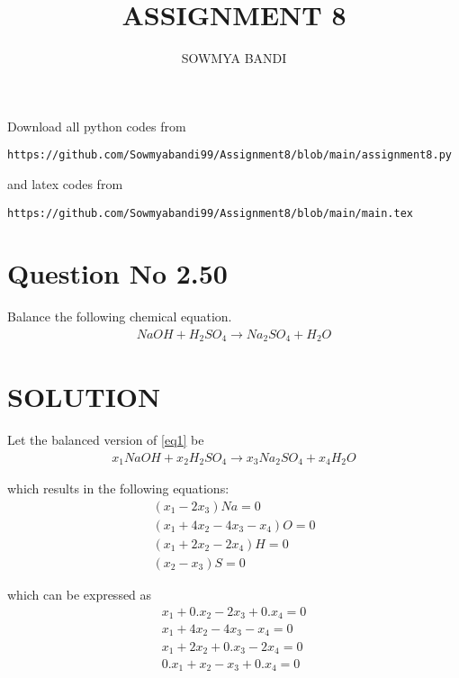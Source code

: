 \documentclass[journal,12pt,twocolumn]{IEEEtran}
\begin{document}
     \def\rightbox#1{\makebox[0in][r]{#1}}
     \def\centbox#1{\makebox[0in]{#1}}
     \def\topbox#1{\raisebox{-\baselineskip}[0in][0in]{#1}}
     \def\midbox#1{\raisebox{-0.5\baselineskip}[0in][0in]{#1}}
\vspace{3cm}
\title{ASSIGNMENT 8}
\author{SOWMYA BANDI}
\maketitle
\newpage
\bigskip
\renewcommand{\thefigure}{\theenumi}
\renewcommand{\thetable}{\theenumi}
Download all python codes from 
%
\begin{lstlisting}
https://github.com/Sowmyabandi99/Assignment8/blob/main/assignment8.py
\end{lstlisting}
%
and latex codes from
%
\begin{lstlisting}
https://github.com/Sowmyabandi99/Assignment8/blob/main/main.tex
\end{lstlisting}
%
\section{Question No 2.50}
Balance the following chemical equation.
\begin{align}
NaOH + H_2SO_4 \xrightarrow{} Na_2SO_4 + H_2O \label{eq1}
\end{align}
%
\section{SOLUTION} 
Let the balanced version of \eqref{eq1} be
\begin{align}
   x_{1}NaOH + x_{2}H_2SO_4 \xrightarrow{} 
   x_{3}Na_2SO_4 + x_{4}H_2O \label{eq2}
\end{align}

which results in the following equations:
\begin{align}
    (x_{1}-2x_{3}) Na= 0\\
    (x_{1}+4x_{2}-4x_{3}-x_{4}) O= 0\\
    (x_{1}+2x_{2}-2x_{4}) H=0\\
    (x_{2}-x_{3}) S= 0
\end{align}

which can be expressed as
\begin{align}
    x_{1}+ 0.x_{2}- 2x_{3}+ 0.x_{4} = 0\\
    x_{1}+ 4x_{2}- 4x_{3}- x_{4} = 0\\
    x_{1}+ 2x_{2}+ 0.x_{3}- 2x_{4} = 0\\
    0.x_{1}+ x_{2}- x_{3}+ 0.x_{4} = 0
\end{align}
\end{document}
